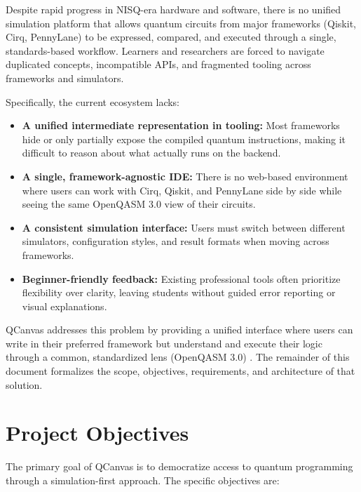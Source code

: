 Despite rapid progress in NISQ-era hardware and software, there is no unified simulation platform that allows quantum circuits from major frameworks (Qiskit, Cirq, PennyLane) to be expressed, compared, and executed through a single, standards-based workflow. Learners and researchers are forced to navigate duplicated concepts, incompatible APIs, and fragmented tooling across frameworks and simulators.

Specifically, the current ecosystem lacks:

\begin{itemize}
    \item \textbf{A unified intermediate representation in tooling:} Most frameworks hide or only partially expose the compiled quantum instructions, making it difficult to reason about what actually runs on the backend.
    \item \textbf{A single, framework-agnostic IDE:} There is no web-based environment where users can work with Cirq, Qiskit, and PennyLane side by side while seeing the same OpenQASM 3.0 view of their circuits.
    \item \textbf{A consistent simulation interface:} Users must switch between different simulators, configuration styles, and result formats when moving across frameworks.
    \item \textbf{Beginner-friendly feedback:} Existing professional tools often prioritize flexibility over clarity, leaving students without guided error reporting or visual explanations.
\end{itemize}

QCanvas addresses this problem by providing a unified interface where users can write in their preferred framework but understand and execute their logic through a common, standardized lens (OpenQASM 3.0) \cite{cross2021openqasm}. The remainder of this document formalizes the scope, objectives, requirements, and architecture of that solution.

\section{Project Objectives}

The primary goal of QCanvas is to democratize access to quantum programming through a simulation-first approach. The specific objectives are:

